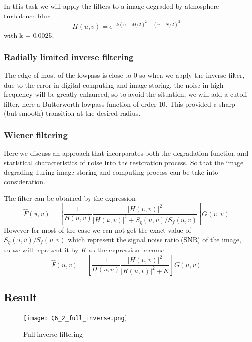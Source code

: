 \documentclass[
	12pt, %
]{style/fphw}
\begin{document}
In this task we will apply the filters to a image degraded by atmosphere turbulence blur $$H(u, v) = e^{-k(u-M/2)^2+(v-N/2)^2}$$ with k = 0.0025.

\subsubsection*{Radially limited inverse filtering}

The edge of most of the lowpass is close to 0 so when we apply the inverse filter, due to the error in digital computing and image storing, the noise in high frequency will be greatly enhanced, so to avoid the situation, we will add a cutoff filter, here a Butterworth lowpass function of order 10. This provided a sharp (but smooth) transition at the desired radius.

\subsubsection*{Wiener filtering}

Here we discuss an approach that incorporates both the degradation function and statistical characteristics of noise into the restoration process. So that the image degrading during image storing and computing process can be take into consideration.

The filter can be obtained by the expression $$\widehat{F}(u, v)=[\frac{1}{H(u, v)} \frac{|H(u, v)|^2}{|H(u, v)|^2+S_\eta (u, v)/ S_f (u, v)}]G(u, v)$$ However for most of the case we can not get the exact value of $S_\eta (u, v)/ S_f (u, v)$ which represent the signal noise ratio (SNR) of the image, so we will represent it by $K$ so the expression become $$\widehat{F}(u, v)=[\frac{1}{H(u, v)} \frac{|H(u, v)|^2}{|H(u, v)|^2 + K}]G(u, v)$$

\subsection*{Result}

\begin{figure}[H]
	\centering
	\texttt{[image: Q6\_2\_full\_inverse.png]}
	\caption{Full inverse filtering}
	\label{Q6_2_full_inverse}
\end{figure}
\end{document}
